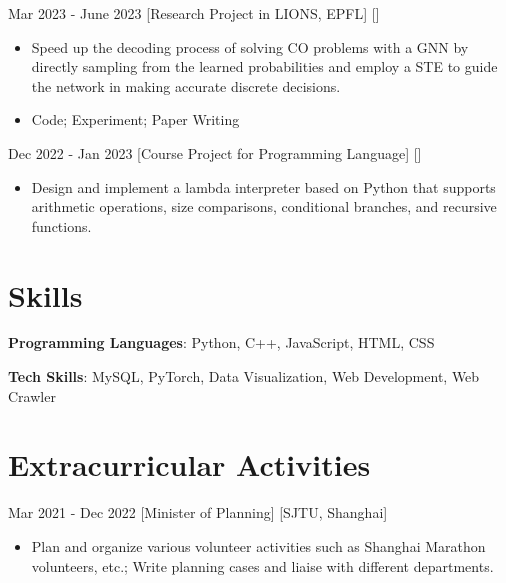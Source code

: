 \documentclass{chicv}
\begin{document}
{Mar 2023 - June 2023}
[Research Project in LIONS, EPFL]
[]

\begin{itemize}
	\item Speed up the decoding process of solving CO problems with a GNN by directly sampling from the learned probabilities and employ a STE to guide the network in making accurate discrete decisions.
	\item Code; Experiment; Paper Writing
\end{itemize}

  {Dec 2022 - Jan 2023}
  [Course Project for Programming Language]
  []
  \begin{itemize}
    \item Design and implement a lambda interpreter based on Python that supports arithmetic operations, size comparisons, conditional branches, and recursive functions.
  \end{itemize}

\section{Skills}

\begin{compactlist}
  \item \textbf{Programming Languages}: Python, C++, JavaScript, HTML, CSS
  \item \textbf{Tech Skills}: MySQL, PyTorch, Data Visualization, Web Development, Web Crawler
\end{compactlist}

\section{Extracurricular Activities}
{Mar 2021 - Dec 2022}
[Minister of Planning]
[SJTU, Shanghai]

\begin{itemize}
	\item Plan and organize various volunteer activities such as Shanghai Marathon volunteers, etc.; Write planning cases and liaise with different departments.
\end{itemize}
\end{document}

